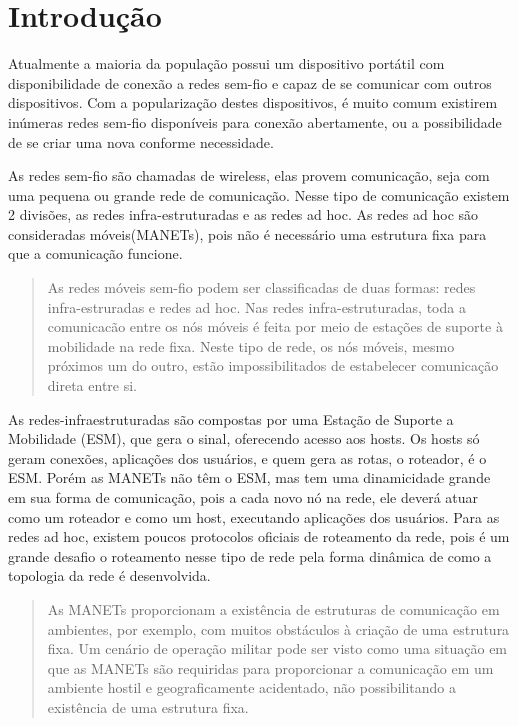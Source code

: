 \section{Introdu\c{c}\~ao} 

Atualmente a maioria da popula\c{c}\~ao possui um dispositivo port\'atil com disponibilidade de conex\~ao a redes sem-fio e capaz de se comunicar com outros dispositivos. Com a populariza\c{c}\~ao destes dispositivos, \'e muito comum existirem in\'umeras redes sem-fio dispon\'iveis para conex\~ao abertamente, ou a possibilidade de se criar uma nova conforme necessidade.

As redes sem-fio s\~ao chamadas de wireless, elas provem comunica\c{c}\~ao, seja com uma pequena ou grande rede de comunica\c{c}\~ao. Nesse tipo de comunica\c{c}\~ao existem 2 divis\~oes, as redes infra-estruturadas e as redes ad hoc. As redes ad hoc s\~ao consideradas m\'oveis(MANETs), pois n\~ao \'e necess\'ario uma estrutura fixa para que a comunica\c{c}\~ao funcione.

\begin{quote}
As redes m\'oveis sem-fio podem ser classificadas de duas formas: redes infra-estruradas e redes ad hoc. Nas redes infra-estruturadas, toda a comunicac\~ao entre os n\'os m\'oveis \'e feita por meio de esta\c{c}\~oes de suporte \`a mobilidade na rede fixa. Neste tipo de rede, os n\'os m\'oveis, mesmo pr\'oximos um do outro, est\~ao impossibilitados de estabelecer comunica\c{c}\~ao direta entre si.\cite{pepe}
\end{quote}

As redes-infraestruturadas s\~ao compostas por uma Esta\c{c}\~ao de Suporte a Mobilidade (ESM), que gera o sinal, oferecendo acesso aos hosts. 
Os hosts s\'o geram conex\~oes, aplica\c{c}\~oes dos usu\'arios, e quem gera as rotas, o roteador, \'e o ESM. Por\'em as MANETs n\~ao t\^em o ESM, mas tem uma dinamicidade grande em sua forma de comunica\c{c}\~ao, pois a cada novo n\'o na rede, ele dever\'a atuar como um roteador e como um host, executando aplica\c{c}\~oes dos usu\'arios. 
Para as redes ad hoc, existem poucos protocolos oficiais de roteamento da rede, pois \'e um grande desafio o roteamento nesse tipo de rede pela forma din\^ amica de como a topologia da rede \'e desenvolvida.

\begin{quote}
As MANETs proporcionam a exist\^encia de estruturas de comunica\c{c}\~ao em ambientes, por exemplo, com muitos obst\'aculos \`a cria\c{c}\~ao de uma estrutura fixa. Um cen\'ario de opera\c{c}\~ao militar pode ser visto como uma situa\c{c}\~ao em que as MANETs s\~ao requiridas para proporcionar a comunica\c{c}\~ao em um ambiente hostil e geograficamente acidentado, n\~ao possibilitando a exist\^encia de uma estrutura fixa.\cite{schimidt}
\end{quote}


